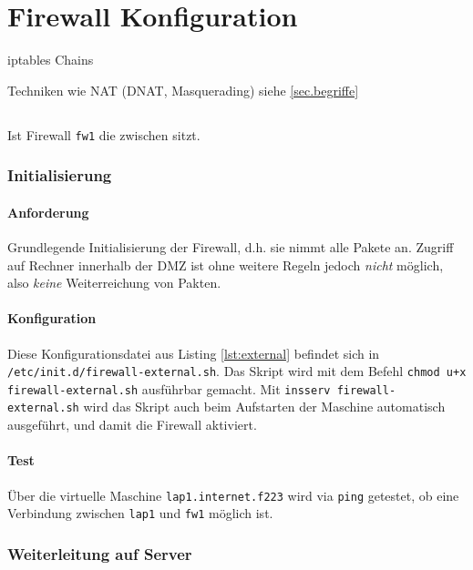 \section{Firewall Konfiguration}

iptables Chains

Techniken wie NAT (DNAT, Masquerading) siehe \ref{sec.begriffe}


\subsection{\fwa}

Ist Firewall {\tt fw1} die zwischen \fwa sitzt.


\subsubsection{Initialisierung}

\paragraph{Anforderung} Grundlegende Initialisierung der Firewall, d.h.
sie nimmt alle Pakete an. Zugriff auf Rechner innerhalb der DMZ ist ohne
weitere Regeln jedoch \emph{nicht} möglich, also \emph{keine} Weiterreichung von
Pakten.

\paragraph{Konfiguration} Diese Konfigurationsdatei aus Listing \ref{lst:external}
befindet sich in {\tt /etc/init.d/firewall-external.sh}.
Das Skript wird mit dem Befehl {\tt chmod u+x firewall-external.sh}
ausführbar gemacht. Mit {\tt insserv firewall-external.sh}
wird das Skript auch beim Aufstarten der Maschine automatisch ausgeführt,
und damit die Firewall aktiviert.



\paragraph{Test} Über die virtuelle Maschine {\tt lap1.internet.f223} wird
via {\tt ping} getestet, ob eine Verbindung zwischen {\tt lap1} und {\tt fw1}
möglich ist.


\subsubsection{Weiterleitung auf Server}

